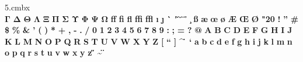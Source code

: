 \documentclass{article}
\begin{document}
5.cmbx\\
\noindent $\mathbf{\Gamma}$ $\mathbf{\Delta}$ $\mathbf{\Theta}$ $\mathbf{\Lambda}$ $\mathbf{\Xi}$ $\mathbf{\Pi}$ $\mathbf{\Sigma}$ $\mathbf{\Upsilon}$ $\mathbf{\Phi}$ $\mathbf{\Psi}$ $\mathbf{\Omega}$ \textbf{ff} \textbf{fi} \textbf{fl} \textbf{ffi} \textbf{ffl} \textbf{\i} \textbf{\j} \textbf{\`} \textbf{\'} \textbf{\v} \textbf{\u} \textbf{\=} \textbf{\r} \textbf{\c} \textbf{\ss} \textbf{\ae} \textbf{\oe} \textbf{\o} \textbf{\AE} \textbf{\OE} \textbf{\O} \textbf{\selectfont\char"20} \textbf{!} \textbf{\textquotedblright} \textbf{\#} \textbf{\$} \textbf{\%} \textbf{\&} \textbf{'} \textbf{(} \textbf{)} \textbf{*} \textbf{+} \textbf{,} \textbf{-} \textbf{.} \textbf{/} \textbf{0} \textbf{1} \textbf{2} \textbf{3} \textbf{4} \textbf{5} \textbf{6} \textbf{7} \textbf{8} \textbf{9} \textbf{:} \textbf{;} \textbf{\textexclamdown} \textbf{=} \textbf{\textquestiondown} \textbf{?} \textbf{@} \textbf{A} \textbf{B} \textbf{C} \textbf{D} \textbf{E} \textbf{F} \textbf{G} \textbf{H} \textbf{I} \textbf{J} \textbf{K} \textbf{L} \textbf{M} \textbf{N} \textbf{O} \textbf{P} \textbf{Q} \textbf{R} \textbf{S} \textbf{T} \textbf{U} \textbf{V} \textbf{W} \textbf{X} \textbf{Y} \textbf{Z} \textbf{[} \textbf{\textquotedblleft} \textbf{]} \textbf{\^} \textbf{\.} \textbf{\textquoteleft} \textbf{a} \textbf{b} \textbf{c} \textbf{d} \textbf{e} \textbf{f} \textbf{g} \textbf{h} \textbf{i} \textbf{j} \textbf{k} \textbf{l} \textbf{m} \textbf{n} \textbf{o} \textbf{p} \textbf{q} \textbf{r} \textbf{s} \textbf{t} \textbf{u} \textbf{v} \textbf{w} \textbf{x} \textbf{y} \textbf{z} \textbf{\textendash} \textbf{\textemdash} \textbf{\H} \textbf{\~} \textbf{\"}\\
\end{document}
